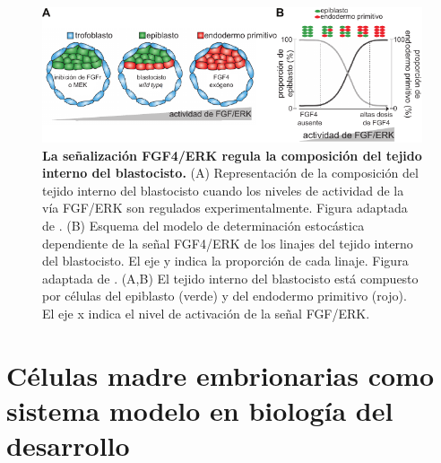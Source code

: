 \documentclass[./main.tex]{subfiles}
\begin{document}
\begin{figure}
    \centering
    \includegraphics[width=1\columnwidth]{figures/chapter1/C1_saltandpepper.pdf} 
    \caption{\textbf{La señalización FGF4/ERK regula la composición del tejido interno del blastocisto.} (A) Representación de la composición del tejido interno del blastocisto cuando los niveles de actividad de la vía FGF/ERK son regulados experimentalmente. Figura adaptada de \cite{Brewer2016}. (B) Esquema del modelo de determinación estocástica dependiente de la señal FGF4/ERK de los linajes del tejido interno del blastocisto. El eje y indica la proporción de cada linaje. Figura adaptada de \cite{Yamanaka2010}. (A,B) El tejido interno del blastocisto está compuesto por células del epiblasto (verde) y del endodermo primitivo (rojo). El eje x indica el nivel de activación de la señal FGF/ERK.}
    \label{C1_fig:saltandpepper}
\end{figure}




\section{Células madre embrionarias como sistema modelo en biología del desarrollo}
\label{C1_sec:ESC}
\end{document}
